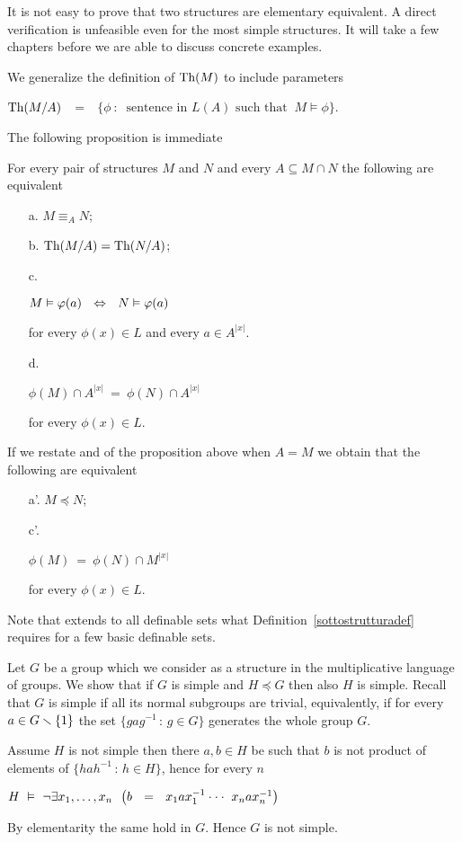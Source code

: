 \documentclass[creche.tex]{subfiles}
\begin{document}
It is not easy to prove that two structures are elementary equivalent.
A direct verification is unfeasible even for the most simple structures.
It will take a few chapters before we are able to discuss concrete examples.
 

We generalize the definition of $\textrm{Th}(M)$ to include parameters 

\hfil \emph{$\textrm{Th}(M/A)$}\ \ =\ \ $\Big\{\phi\ :\ \textrm{ sentence in }L(A)\textrm{  such that }\  M\models\phi\Big\}$.

The following proposition is immediate

\begin{proposition}\label{equivalentielementareequivaleza}
For every pair of structures $M$ and $N$ and every $A\subseteq M\cap N$ the following are equivalent
\begin{itemize}
\item[a.] $M\equiv_A N$;
\item[b.] $\textrm{Th}(M/A)=\textrm{Th}(N/A)$;
\item[c.] \parbox{26ex}{$M\vDash\varphi(a)\ \ \Leftrightarrow\ \ N\vDash \varphi(a)$}  for every $\phi(x)\in L$ and every $a\in A^{|x|}$.
\item[d.]  \parbox{26ex}{$\phi(M) \cap A^{|x|}\ =\ \phi(N) \cap A^{|x|}$} for every $\phi(x)\in L$.\QED
\end{itemize}
\end{proposition}

If we restate  and  of the proposition above when $A=M$ we obtain that the following are equivalent
\begin{itemize}
\item[a'.] $M\preceq N$;
\item[c'.] \parbox{26ex}{$\phi(M)\ =\ \phi(N) \cap M^{|x|}$} for every $\phi(x)\in L$.
\end{itemize}
Note that  extends to all definable sets what Definition~\ref{sottostrutturadef} requires for a few basic definable sets.

\begin{example}
Let $G$ be a group which we consider as a structure in the multiplicative language of groups.
We show that if $G$ is simple and $H\preceq G$ then also $H$ is simple.
Recall that $G$ is simple if all its normal subgroups are trivial, equivalently, if for every $a\in G\smallsetminus \{1\}$ the set $\big\{gag^{-1}\,:\,g\in G\big\}$ generates the whole group $G$.


Assume $H$ is not simple then there $a,b\in H$ be such that $b$ is not product of elements of $\big\{hah^{-1}\,:\,h\in H\big\}$, hence for every $n$ 

\hfil$H\ \models\ \neg\E x_1,\dots,x_n\ \ \big(b\ \ =\ \ x_1ax_1^{-1}\cdot\cdot\cdot\ x_nax_n^{-1}\big)$

By elementarity the same hold in $G$.
Hence $G$ is not simple.\QED 
\end{example}
\end{document}
